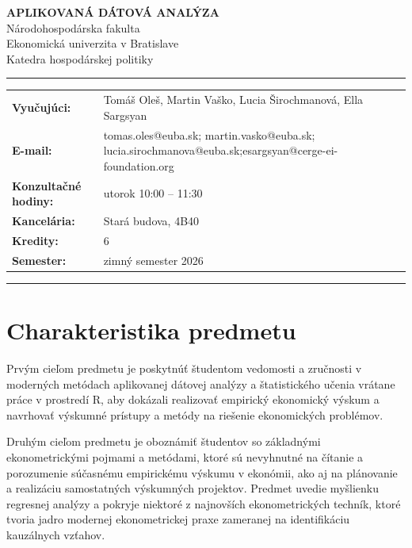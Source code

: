 \documentclass[11pt]{article}
\newcommand{\hdivider}{\noindent\rule{\textwidth}{0.8pt}}
\begin{document}
\begin{center}
{\LARGE\bfseries\color{oxfordblue} APLIKOVANÁ DÁTOVÁ ANALÝZA}\\[2pt]
{\large Národohospodárska fakulta}\\[1pt]
{\large Ekonomická univerzita v Bratislave}\\[1pt]
{\large Katedra hospodárskej politiky}
\end{center}

\hdivider
\smallskip

\noindent
\begin{tabular}{@{}>{\bfseries}p{3.4cm}p{12.6cm}@{}}
Vyučujúci: & Tomáš Oleš, Martin Vaško, Lucia Širochmanová, Ella Sargsyan \\
E-mail: & tomas.oles@euba.sk; martin.vasko@euba.sk; lucia.sirochmanova@euba.sk;\newline esargsyan@cerge-ei-foundation.org \\
Konzultačné hodiny: & utorok 10:00 -- 11:30 \\
Kancelária: & Stará budova, 4B40 \\
Kredity: & 6 \\
Semester: & zimný semester 2026 \\
\end{tabular}

\smallskip
\hdivider

\section{Charakteristika predmetu}

Prvým cieľom predmetu je poskytnúť študentom vedomosti a zručnosti v moderných metódach aplikovanej dátovej
analýzy a štatistického učenia vrátane práce v prostredí R, aby dokázali realizovať empirický ekonomický
výskum a navrhovať výskumné prístupy a metódy na riešenie ekonomických problémov.

Druhým cieľom predmetu je oboznámiť študentov so základnými ekonometrickými pojmami a metódami, ktoré sú
nevyhnutné na čítanie a porozumenie súčasnému empirickému výskumu v ekonómii, ako aj na plánovanie a
realizáciu samostatných výskumných projektov. Predmet uvedie myšlienku regresnej analýzy a pokryje niektoré
z najnovších ekonometrických techník, ktoré tvoria jadro modernej ekonometrickej praxe zameranej na
identifikáciu kauzálnych vzťahov.
\end{document}
